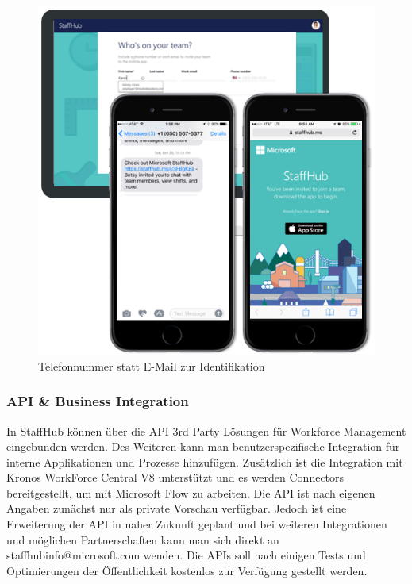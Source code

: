 \begin{figure}[H] 
\centering 
\includegraphics[scale=0.82]{images/invite} 
\caption[Telefonnummer statt E-Mail zur Identifikation]{Telefonnummer statt E-Mail zur Identifikation\protect} 
\label{ws} 
\end{figure}

\subsubsection{API \& Business Integration}

In StaffHub können über die API 3rd Party Lösungen für Workforce Management eingebunden werden. Des Weiteren kann man benutzerspezifische Integration für interne Applikationen und Prozesse hinzufügen. Zusätzlich ist die Integration mit Kronos WorkForce Central V8 unterstützt und es werden Connectors bereitgestellt, um mit Microsoft Flow zu arbeiten.
Die API ist nach eigenen Angaben zunächst nur als private Vorschau verfügbar. Jedoch ist eine Erweiterung der API in naher Zukunft geplant und bei weiteren Integrationen und möglichen Partnerschaften kann man sich direkt an staffhubinfo@microsoft.com wenden. Die APIs soll nach einigen Tests und Optimierungen der Öffentlichkeit kostenlos zur Verfügung gestellt werden.

